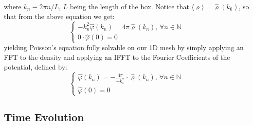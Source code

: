 \documentclass{article}
\begin{document}
where $k_n \equiv 2\pi n / L$, $L$ being the length of the box. Notice that $\langle\varrho\rangle = \hat{\varrho}(k_0)$, so that from the above equation we get:
\begin{equation*}
    \begin{cases}
    -k_n^2 \hat{\varphi}(k_n) = 4 \pi \hat{\varrho}(k_n) \text{, $\forall n \in \mathbb{N}$} \\
    0\cdot \hat{\varphi}(0) = 0
    \end{cases}
\end{equation*}
yielding Poisson's equation fully solvable on our 1D mesh by simply applying an FFT to the density and applying an IFFT to the Fourier Coefficients of the potential, defined by:
\begin{equation*}
    \begin{cases}
    \hat{\varphi}(k_n) = - \frac{4 \pi}{-k_n^2} \cdot \hat{\varrho}(k_n) \text{, $\forall n \in \mathbb{N}$} \\
    \hat{\varphi}(0) = 0
    \end{cases}
\end{equation*}

\subsection{Time Evolution}
\end{document}
